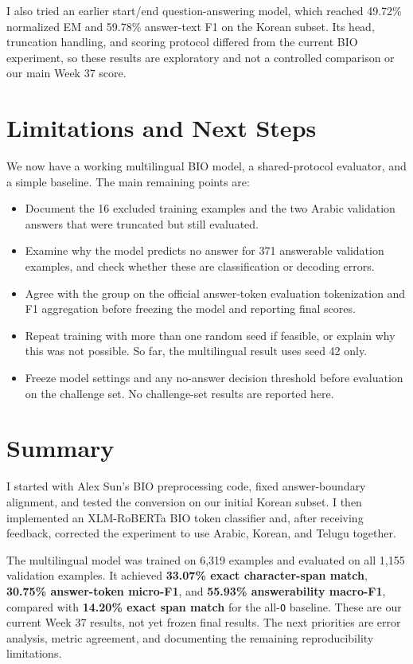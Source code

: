 \documentclass[a4paper,11pt]{article}
\begin{document}
I also tried an earlier start/end question-answering model, which reached 49.72\% normalized EM and 59.78\% answer-text F1 on the Korean subset. Its head, truncation handling, and scoring protocol differed from the current BIO experiment, so these results are exploratory and not a controlled comparison or our main Week 37 score.

\section{Limitations and Next Steps}

We now have a working multilingual BIO model, a shared-protocol evaluator, and a simple baseline. The main remaining points are:
\begin{itemize}[noitemsep]
    \item Document the 16 excluded training examples and the two Arabic validation answers that were truncated but still evaluated.
    \item Examine why the model predicts no answer for 371 answerable validation examples, and check whether these are classification or decoding errors.
    \item Agree with the group on the official answer-token evaluation tokenization and F1 aggregation before freezing the model and reporting final scores.
    \item Repeat training with more than one random seed if feasible, or explain why this was not possible. So far, the multilingual result uses seed 42 only.
    \item Freeze model settings and any no-answer decision threshold before evaluation on the challenge set. No challenge-set results are reported here.
\end{itemize}

\section{Summary}

I started with Alex Sun's BIO preprocessing code, fixed answer-boundary alignment, and tested the conversion on our initial Korean subset. I then implemented an XLM-RoBERTa BIO token classifier and, after receiving feedback, corrected the experiment to use Arabic, Korean, and Telugu together.

The multilingual model was trained on 6,319 examples and evaluated on all 1,155 validation examples. It achieved \textbf{33.07\% exact character-span match}, \textbf{30.75\% answer-token micro-F1}, and \textbf{55.93\% answerability macro-F1}, compared with \textbf{14.20\% exact span match} for the all-\texttt{O} baseline. These are our current Week 37 results, not yet frozen final results. The next priorities are error analysis, metric agreement, and documenting the remaining reproducibility limitations.
\end{document}
